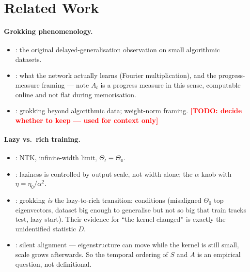 \documentclass[a4paper,11pt]{article} %
\newcommand{\TODO}[1]{\textcolor{red}{\textbf{[TODO: #1]}}}
\begin{document}
\section{Related Work}
\label{sec:related}


\paragraph{Grokking phenomenology.}
\begin{itemize}
	\item \citet{power2022grokking}: the original delayed-generalisation
		observation on small algorithmic datasets.
	\item \citet{nanda2023progress}: what the network actually learns (Fourier
		multiplication), and the progress-measure framing --- note $A_t$ is a
		progress measure in this sense, computable online and not flat during
		memorisation.
	\item \citet{liu2023omnigrok}: grokking beyond algorithmic data; weight-norm
		framing. \TODO{decide whether to keep --- used for context only}
\end{itemize}

\paragraph{Lazy vs.\ rich training.}
\begin{itemize}
	\item \citet{jacot2018ntk}: NTK, infinite-width limit, $\Theta_t\equiv\Theta_0$.
	\item \citet{chizat2019lazy}: laziness is controlled by output scale, not
		width alone; the $\alpha$ knob with $\eta=\eta_0/\alpha^2$.
	\item \citet{kumar2024grokking}: grokking \emph{is} the lazy-to-rich
		transition; conditions (misaligned $\Theta_0$ top eigenvectors, dataset big
		enough to generalise but not so big that train tracks test, lazy start).
		Their evidence for ``the kernel changed'' is exactly the unidentified
		statistic $D$.
	\item \citet{atanasov2022silent}: silent alignment --- eigenstructure can move
		while the kernel is still small, scale grows afterwards. So the temporal
		ordering of $S$ and $A$ is an empirical question, not definitional.
\end{itemize}
\end{document}
